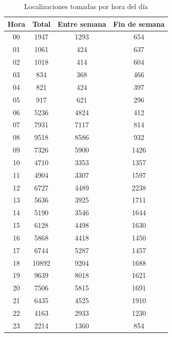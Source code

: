 \begin{table}[!h]
	\centering
	\begin{tabular}{cccc}
        \toprule
    	Hora  & Total & Entre semana & Fin de semana\\
    	\midrule
    	00 & 1947 & 1293 & 654 \\
    	01 & 1061 & 424 & 637 \\
    	02 & 1018 & 414 & 604 \\ 
    	03 & 834 & 368 & 466\\
    	04 & 821 & 424 & 397\\
    	05 & 917 & 621 & 296\\
    	06 & 5236 & 4824 & 412 \\
    	07 & 7931 & 7117 & 814\\
    	08 & 9518 & 8586 & 932\\
    	09 & 7326 & 5900 & 1426\\ 
    	10 & 4710 & 3353 & 1357\\
    	11 & 4904 & 3307 & 1597\\
    	12 & 6727 & 4489 & 2238\\
    	13 & 5636 & 3925 & 1711\\
    	14 & 5190 & 3546 & 1644\\
    	15 & 6128 & 4498 & 1630\\
    	16 & 5868 & 4418 & 1450\\ 
    	17 & 6744 & 5287 & 1457\\
    	18 & 10892 & 9204 & 1688\\
    	19 & 9639 & 8018 & 1621\\
    	20 & 7506 & 5815 & 1691\\
    	21 & 6435 & 4525 & 1910\\
    	22 & 4163 & 2933 & 1230 \\
    	23 & 2214 & 1360 & 854\\
    	\bottomrule
	\end{tabular}
	\caption{Localizaciones tomadas por hora del día} 
	\label{table:localizaciones_por_hora}
\end{table}

